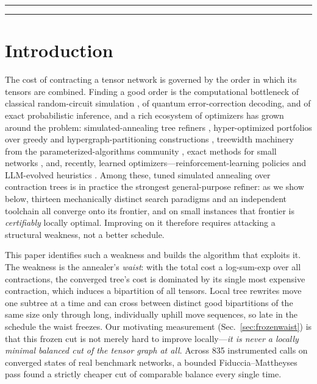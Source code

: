 \documentclass{SciPost}
\begin{document}
\linenumbers

\vspace{10pt}
\noindent\rule{\textwidth}{1pt}
\tableofcontents
\noindent\rule{\textwidth}{1pt}
\vspace{10pt}


\section{Introduction}
\label{sec:intro}

The cost of contracting a tensor network is governed by the order in which
its tensors are combined. Finding a good order is the computational
bottleneck of classical random-circuit simulation
\cite{markov_2005_simulating, liu_2022_verifying}, of quantum
error-correction decoding, and of exact probabilistic inference, and a
rich ecosystem of optimizers has grown around the problem:
simulated-annealing tree refiners \cite{kalachev_2021_multi},
hyper-optimized portfolios over greedy and hypergraph-partitioning
constructions \cite{gray_2020_hyper, staudt_2024_improved}, treewidth
machinery from the parameterized-algorithms community
\cite{dumitrescu_2018_benchmarking, tamaki_2017_positive}, exact
methods for small networks \cite{pfeifer_2013_faster}, and, recently,
learned optimizers---reinforcement-learning policies
\cite{meirom_2022_optimizing} and LLM-evolved heuristics
\cite{hoppe_2026_algorithmic}. Among these, tuned
simulated annealing over contraction trees is in practice the strongest
general-purpose refiner: as we show below, thirteen mechanically distinct
search paradigms and an independent toolchain all converge onto its
frontier, and on small instances that frontier is \emph{certifiably}
locally optimal. Improving on it therefore requires attacking a
structural weakness, not a better schedule.

This paper identifies such a weakness and builds the algorithm that
exploits it. The weakness is the annealer's \emph{waist}: with the total
cost a log-sum-exp over all contractions, the converged tree's cost is
dominated by its single most expensive contraction, which induces a
bipartition of all tensors. Local tree rewrites move one subtree at a time
and can cross between distinct good bipartitions of the same size only
through long, individually uphill move sequences, so late in the schedule
the waist freezes. Our motivating measurement
(Sec.~\ref{sec:frozenwaist}) is that this frozen cut is not merely hard
to improve locally---\emph{it is never a locally minimal balanced cut of
the tensor graph at all}. Across 835 instrumented calls on converged
states of real benchmark networks, a bounded Fiduccia--Mattheyses pass
found a strictly cheaper cut of comparable balance every single time.
\end{document}
